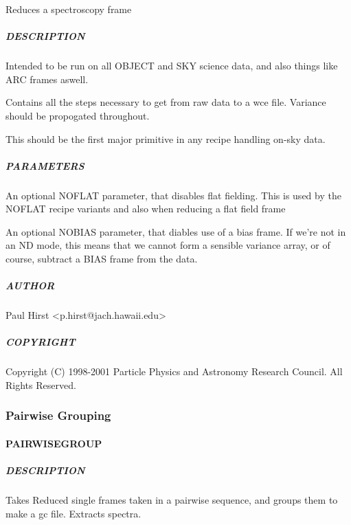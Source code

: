 \documentclass[twoside,11pt]{article}
\renewcommand{\_}{\texttt{\symbol{95}}}
\begin{document}
Reduces a spectroscopy frame

\subparagraph*{DESCRIPTION\label{_REDUCE_SINGLE_FRAME__DESCRIPTION}}

Intended to be run on all OBJECT and SKY science data, and also things
like ARC frames aswell.



Contains all the steps necessary to get from raw data to a \_wce file.
Variance should be propogated throughout.



This should be the first major primitive in any recipe handling on-sky
data.

\subparagraph*{PARAMETERS\label{_REDUCE_SINGLE_FRAME__PARAMETERS}}

An optional NOFLAT parameter, that disables flat fielding.
This is used by the \_NOFLAT recipe variants and also when
reducing a flat field frame



An optional NOBIAS parameter, that diables use of a bias frame.
If we're not in an ND mode, this means that we cannot form a sensible
variance array, or of course, subtract a BIAS frame from the data.

\subparagraph*{AUTHOR\label{_REDUCE_SINGLE_FRAME__AUTHOR}}

Paul Hirst <p.hirst@jach.hawaii.edu>

\subparagraph*{COPYRIGHT\label{_REDUCE_SINGLE_FRAME__COPYRIGHT}}

Copyright (C) 1998-2001 Particle Physics and Astronomy Research
Council. All Rights Reserved.


\subsubsection{Pairwise Grouping}

\paragraph*{\_PAIRWISE\_GROUP\_\label{_PAIRWISE_GROUP_}}



\subparagraph*{DESCRIPTION\label{_PAIRWISE_GROUP__DESCRIPTION}}

Takes Reduced single frames taken in a pairwise sequence, and groups them
to make a gc file. Extracts spectra.
\end{document}
